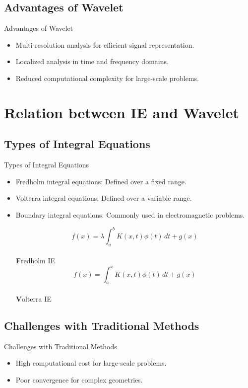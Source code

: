 \documentclass{beamer}
\begin{document}
\subsection{Advantages of Wavelet}
\begin{frame}{Advantages of Wavelet}
    \begin{itemize}
        \item Multi-resolution analysis for efficient signal representation.
        \item Localized analysis in time and frequency domains.
        \item Reduced computational complexity for large-scale problems.
    \end{itemize}
\end{frame}

\section{Relation between IE and Wavelet}
\subsection{Types of Integral Equations}
\begin{frame}{Types of Integral Equations}
    \begin{itemize}
        \item Fredholm integral equations: Defined over a fixed range.
        \item Volterra integral equations: Defined over a variable range.
        \item Boundary integral equations: Commonly used in electromagnetic problems.
        \vfill 
        \centering
        
        \[
              f(x) = \lambda \int_a^b K(x, t)\phi(t) \,dt + g(x)
        \]
        \\[0.2cm]
        {\small \textbf Fredholm IE}
        \[
              f(x) = \int_a^x K(x, t)\phi(t) \,dt + g(x)
        \]
        \\[0.2cm]
        {\small \textbf Volterra IE}
    \end{itemize}
\end{frame}

\subsection{Challenges with Traditional Methods}
\begin{frame}{Challenges with Traditional Methods}
    \begin{itemize}
        \item High computational cost for large-scale problems.
        \item Poor convergence for complex geometries.
    \end{itemize}
\end{frame}
\end{document}
